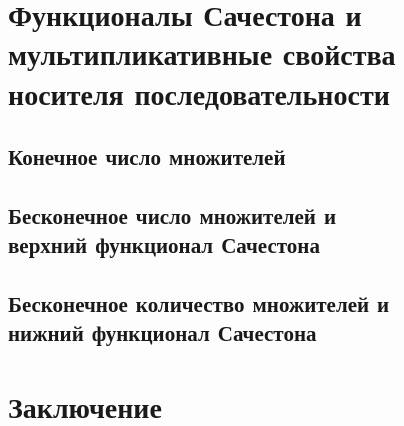 \documentclass[12pt,a4paper,openbib]{report}
\theoremstyle{definition}
\newcommand\hypotlist{ }
\begin{document}
	


\chapter{Функционалы Сачестона и мультипликативные свойства носителя последовательности}

	

	\section{Конечное число множителей}
	

	\section{Бесконечное число множителей и \\  верхний функционал Сачестона}
	

	\section{Бесконечное количество множителей и \\ нижний функционал Сачестона}
	




\chapter*{Заключение}







\makeatletter
{}%
{\toggletrue{bbx:gostbibliography}%
\renewcommand*{\revsdnamepunct}{\addcomma}}{}
\makeatother

\printbibliography{}
\end{document}

